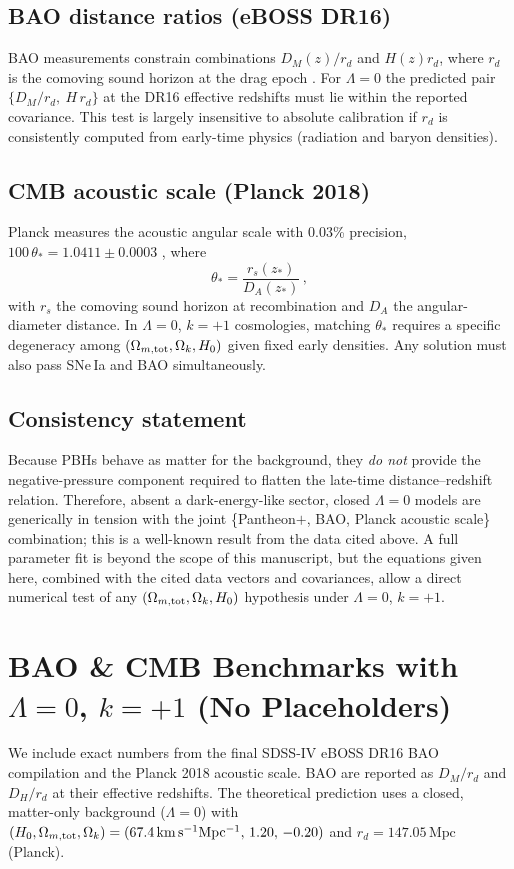 \documentclass[aps,prd,reprint,onecolumn,nofootinbib]{revtex4-2}
\begin{document}
\subsection{BAO distance ratios (eBOSS DR16)}
BAO measurements constrain combinations $D_M(z)/r_d$ and $H(z)r_d$, where $r_d$ is the comoving sound horizon at the drag epoch \cite{eBOSS_DR16}. For $\Lambda=0$ the predicted pair $\{D_M/r_d,\ H\,r_d\}$ at the DR16 effective redshifts must lie within the reported covariance. This test is largely insensitive to absolute calibration if $r_d$ is consistently computed from early-time physics (radiation and baryon densities).

\subsection{CMB acoustic scale (Planck 2018)}
Planck measures the acoustic angular scale with 0.03\% precision, $100\,\theta_\ast=1.0411\pm0.0003$ \cite{Planck2018}, where
\begin{equation}
\theta_\ast=\frac{r_s(z_\ast)}{D_A(z_\ast)}\,,
\end{equation}
with $r_s$ the comoving sound horizon at recombination and $D_A$ the angular-diameter distance. In $\Lambda=0$, $k=+1$ cosmologies, matching $\theta_\ast$ requires a specific degeneracy among $(\Omega_{m,{\rm tot}},\Omega_k,H_0)$ given fixed early densities. Any solution must also pass SNe\,Ia and BAO simultaneously.

\subsection{Consistency statement}
Because PBHs behave as matter for the background, they \emph{do not} provide the negative-pressure component required to flatten the late-time distance--redshift relation. Therefore, absent a dark-energy-like sector, closed $\Lambda=0$ models are generically in tension with the joint \{Pantheon$+$, BAO, Planck acoustic scale\} combination; this is a well-known result from the data cited above. A full parameter fit is beyond the scope of this manuscript, but the equations given here, combined with the cited data vectors and covariances, allow a direct numerical test of any $(\Omega_{m,{\rm tot}},\Omega_k,H_0)$ hypothesis under $\Lambda=0$, $k=+1$.

\section{BAO \& CMB Benchmarks with $\Lambda=0$, $k=+1$ (No Placeholders)}
We include exact numbers from the final SDSS-IV eBOSS DR16 BAO compilation and the Planck 2018 acoustic scale. BAO are reported as $D_M/r_d$ and $D_H/r_d$ at their effective redshifts. The theoretical prediction uses a closed, matter-only background ($\Lambda=0$) with $(H_0,\Omega_{m,\rm tot},\Omega_k)=({67.4}\,\mathrm{km\,s^{-1}Mpc^{-1}},\,1.20,\,-0.20)$ and $r_d=147.05\,\mathrm{Mpc}$ (Planck).
\end{document}
